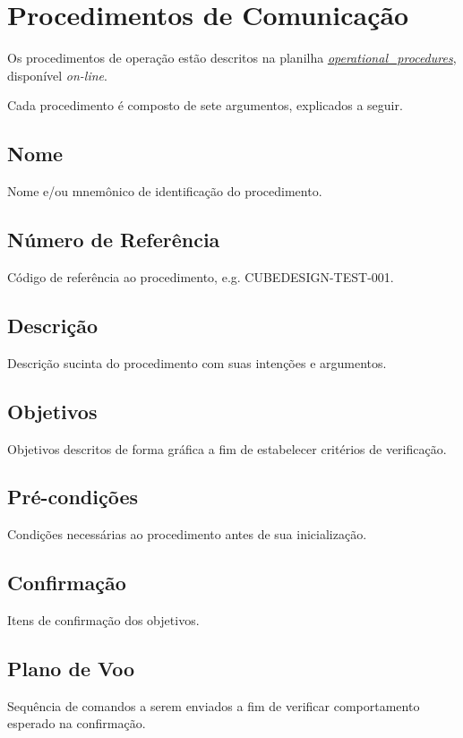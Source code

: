 
\section{Procedimentos de Comunicação}

Os procedimentos de operação estão descritos na planilha  \href{https://docs.google.com/spreadsheets/d/1-53UZxprwHAYcvuDQwhXedCE74TNXDuPiL6tidaUT7g/edit?usp=sharing}{\textit{operational\_procedures}}, disponível \textit{on-line}.

Cada procedimento é composto de sete argumentos, explicados a seguir.

\subsection{Nome}

Nome e/ou mnemônico de identificação do procedimento.

\subsection{Número de Referência}

Código de referência ao procedimento, e.g. CUBEDESIGN-TEST-001.

\subsection{Descrição}

Descrição sucinta do procedimento com suas intenções e argumentos.

\subsection{Objetivos}

Objetivos descritos de forma gráfica a fim de estabelecer critérios de verificação.

\subsection{Pré-condições}

Condições necessárias ao procedimento antes de sua inicialização.

\subsection{Confirmação}

Itens de confirmação dos objetivos.

\subsection{Plano de Voo}

Sequência de comandos a serem enviados a fim de verificar comportamento esperado na confirmação.
